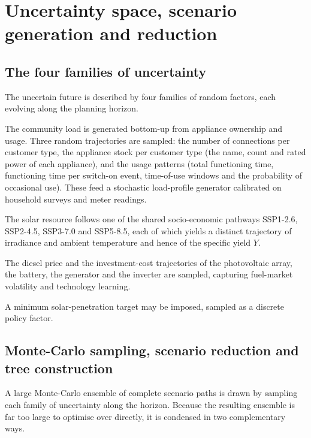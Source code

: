 \documentclass[11pt,a4paper]{article}
\theoremstyle{plain}
\theoremstyle{definition}
\begin{document}
\section{Uncertainty space, scenario generation and reduction}
\label{sec:scenarios}

\subsection{The four families of uncertainty}

The uncertain future is described by four families of random factors, each evolving along
the planning horizon.
\begin{description}[leftmargin=2.4cm,style=nextline]
  \item[Demand] The community load is generated bottom-up from appliance ownership and
  usage. Three random trajectories are sampled: the number of connections per customer
  type, the appliance stock per customer type (the name, count and rated power of each
  appliance), and the usage patterns (total functioning time, functioning time per
  switch-on event, time-of-use windows and the probability of occasional use). These feed
  a stochastic load-profile generator calibrated on household surveys and meter readings.
  \item[Renewable resource] The solar resource follows one of the shared
  socio-economic pathways SSP1-2.6, SSP2-4.5, SSP3-7.0 and SSP5-8.5, each of which yields
  a distinct trajectory of irradiance and ambient temperature and hence of the specific
  yield $Y$.
  \item[Economic conditions] The diesel price and the investment-cost trajectories of the
  photovoltaic array, the battery, the generator and the inverter are sampled, capturing
  fuel-market volatility and technology learning.
  \item[Policy] A minimum solar-penetration target may be imposed, sampled as a discrete
  policy factor.
\end{description}

\subsection{Monte-Carlo sampling, scenario reduction and tree construction}

A large Monte-Carlo ensemble of complete scenario paths is drawn by sampling each family
of uncertainty along the horizon. Because the resulting ensemble is far too large to
optimise over directly, it is condensed in two complementary ways.
\end{document}
